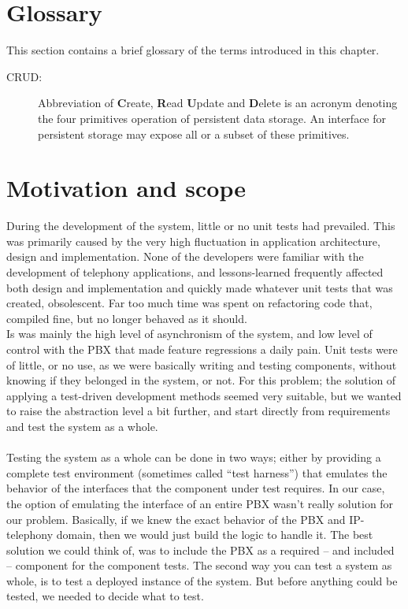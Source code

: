 \section{Glossary}
This section contains a brief glossary of the terms introduced in this chapter.
\begin{description}
  \item[CRUD:] Abbreviation of \textbf{C}reate, \textbf{R}ead \textbf{U}pdate and \textbf{D}elete is an acronym denoting the four primitives operation of persistent data storage. An interface for persistent storage may expose all or a subset of these primitives.
\end{description}

\section{Motivation and scope}
During the development of the system, little or no unit tests had prevailed. This  was primarily caused by the very high fluctuation in application architecture, design and implementation. None of the developers were familiar with the development of telephony applications, and lessons-learned frequently affected both design and implementation and quickly made whatever unit tests that was created, obsolescent. Far too much time was spent on refactoring code that, compiled fine, but no longer behaved as it should.\\
Is was mainly the high level of asynchronism of the system, and low level of control with the PBX that made feature regressions a daily pain. Unit tests were of little, or no use, as we were basically writing and testing components, without knowing if they belonged in the system, or not. For this problem; the solution of applying a test-driven development methods seemed very suitable, but we wanted to raise the abstraction level a bit further, and start directly from requirements and test the system as a whole.\\\\
Testing the system as a whole can be done in two ways; either by providing a complete test environment (sometimes called ``test harness'') that emulates the behavior of the interfaces that the component under test requires. In our case, the option of emulating the interface of an entire PBX wasn't really solution for our problem. Basically, if we knew the exact behavior of the PBX and IP-telephony domain, then we would just build the logic to handle it. The best solution we could think of, was to include the PBX as a required -- and included -- component for the component tests.
The second way you can test a system as whole, is to test a deployed instance of the system. But before anything could be tested, we needed to decide what to test.

